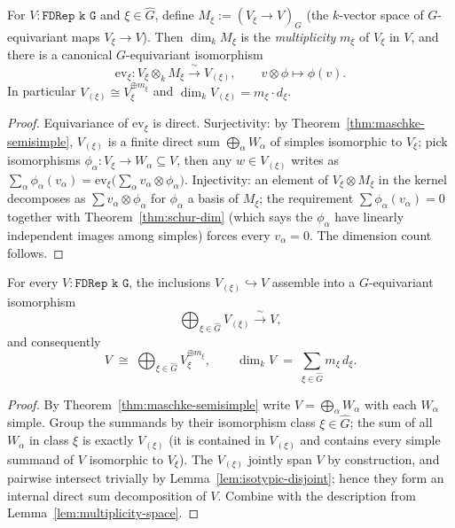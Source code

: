 \begin{lemma}
  \label{lem:multiplicity-space}
  For $V : \texttt{FDRep k G}$ and $\xi \in \hat G$, define
  $M_\xi := (V_\xi \to V)_G$ (the $k$-vector space of $G$-equivariant maps
  $V_\xi \to V$). Then $\dim_k M_\xi$ is the \emph{multiplicity} $m_\xi$ of
  $V_\xi$ in $V$, and there is a canonical $G$-equivariant isomorphism
  \[
    \mathrm{ev}_\xi : V_\xi \otimes_k M_\xi \xrightarrow{\ \sim\ } V_{(\xi)},
    \qquad v \otimes \phi \longmapsto \phi(v).
  \]
  In particular $V_{(\xi)} \cong V_\xi^{\oplus m_\xi}$ and
  $\dim_k V_{(\xi)} = m_\xi \cdot d_\xi$.
\end{lemma}

\begin{proof}
  Equivariance of $\mathrm{ev}_\xi$ is direct.  Surjectivity: by
  Theorem~\ref{thm:maschke-semisimple}, $V_{(\xi)}$ is a finite direct sum
  $\bigoplus_{\alpha} W_\alpha$ of simples isomorphic to $V_\xi$; pick
  isomorphisms $\phi_\alpha : V_\xi \to W_\alpha \subseteq V$, then any
  $w \in V_{(\xi)}$ writes as $\sum_\alpha \phi_\alpha(v_\alpha) =
  \mathrm{ev}_\xi\big(\sum_\alpha v_\alpha \otimes \phi_\alpha\big)$.
  Injectivity: an element of $V_\xi \otimes M_\xi$ in the kernel decomposes
  as $\sum v_\alpha \otimes \phi_\alpha$ for $\phi_\alpha$ a basis of
  $M_\xi$; the requirement $\sum \phi_\alpha(v_\alpha) = 0$ together with
  Theorem~\ref{thm:schur-dim} (which says the $\phi_\alpha$ have linearly
  independent images among simples) forces every $v_\alpha = 0$.
  The dimension count follows.
\end{proof}

\begin{theorem}
  \label{thm:isotypic-decomposition}
  For every $V : \texttt{FDRep k G}$, the inclusions $V_{(\xi)} \hookrightarrow V$
  assemble into a $G$-equivariant isomorphism
  \[
    \bigoplus_{\xi \in \hat G} V_{(\xi)} \xrightarrow{\ \sim\ } V,
  \]
  and consequently
  \[
    V \;\cong\; \bigoplus_{\xi \in \hat G} V_\xi^{\oplus m_\xi},
    \qquad \dim_k V \;=\; \sum_{\xi \in \hat G} m_\xi\, d_\xi.
  \]
\end{theorem}

\begin{proof}
  By Theorem~\ref{thm:maschke-semisimple} write $V = \bigoplus_\alpha W_\alpha$
  with each $W_\alpha$ simple. Group the summands by their isomorphism
  class $\xi \in \hat G$; the sum of all $W_\alpha$ in class $\xi$ is exactly
  $V_{(\xi)}$ (it is contained in $V_{(\xi)}$ and contains every simple summand
  of $V$ isomorphic to $V_\xi$). The $V_{(\xi)}$ jointly span $V$ by
  construction, and pairwise intersect trivially by
  Lemma~\ref{lem:isotypic-disjoint}; hence they form an internal direct sum
  decomposition of $V$. Combine with the description from
  Lemma~\ref{lem:multiplicity-space}.
\end{proof}


